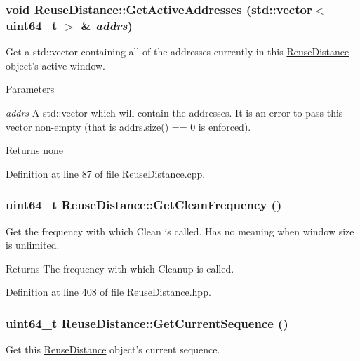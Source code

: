 \hypertarget{class_reuse_distance_acc4885040a8a518fc10b5aa4da7d777a}{
\subsubsection[{GetActiveAddresses}]{\setlength{\rightskip}{0pt plus 5cm}void ReuseDistance::GetActiveAddresses (std::vector$<$ uint64\_\-t $>$ \& {\em addrs})}}
\label{class_reuse_distance_acc4885040a8a518fc10b5aa4da7d777a}
Get a std::vector containing all of the addresses currently in this \hyperlink{class_reuse_distance}{ReuseDistance} object's active window.


\begin{DoxyParams}{Parameters}
\item[{\em addrs}]A std::vector which will contain the addresses. It is an error to pass this vector non-\/empty (that is addrs.size() == 0 is enforced).\end{DoxyParams}
\begin{DoxyReturn}{Returns}
none 
\end{DoxyReturn}


Definition at line 87 of file ReuseDistance.cpp.

\hypertarget{class_reuse_distance_a2dd5a5a59a4cb8172ab9f9d2ae72ba85}{
\subsubsection[{GetCleanFrequency}]{\setlength{\rightskip}{0pt plus 5cm}uint64\_\-t ReuseDistance::GetCleanFrequency ()}}
\label{class_reuse_distance_a2dd5a5a59a4cb8172ab9f9d2ae72ba85}
Get the frequency with which Clean is called. Has no meaning when window size is unlimited.

\begin{DoxyReturn}{Returns}
The frequency with which Cleanup is called. 
\end{DoxyReturn}


Definition at line 408 of file ReuseDistance.hpp.

\hypertarget{class_reuse_distance_a5e88535f0b223c0e6d6ab1f4a1aa29ba}{
\subsubsection[{GetCurrentSequence}]{\setlength{\rightskip}{0pt plus 5cm}uint64\_\-t ReuseDistance::GetCurrentSequence ()}}
\label{class_reuse_distance_a5e88535f0b223c0e6d6ab1f4a1aa29ba}
Get this \hyperlink{class_reuse_distance}{ReuseDistance} object's current sequence.

